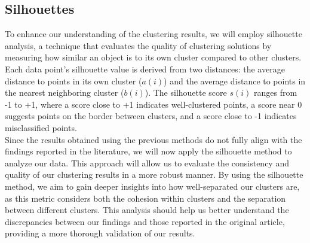 \documentclass{article}
\begin{document}
\subsection{Silhouettes}
To enhance our understanding of the clustering results, we will employ silhouette analysis, a technique that evaluates the quality of clustering solutions by measuring how similar an object is to its own cluster compared to other clusters. Each data point's silhouette value is derived from two distances: the average distance to points in its own cluster (\(a(i)\)) and the average distance to points in the nearest neighboring cluster (\(b(i)\)). The silhouette score \(s(i)\) ranges from -1 to +1, where a score close to +1 indicates well-clustered points, a score near 0 suggests points on the border between clusters, and a score close to -1 indicates misclassified points. 
\\

Since the results obtained using the previous methods do not fully align with the findings reported in the literature, we will now apply the silhouette method to analyze our data. This approach will allow us to evaluate the consistency and quality of our clustering results in a more robust manner. By using the silhouette method, we aim to gain deeper insights into how well-separated our clusters are, as this metric considers both the cohesion within clusters and the separation between different clusters. This analysis should help us better understand the discrepancies between our findings and those reported in the original article, providing a more thorough validation of our results.
\end{document}
